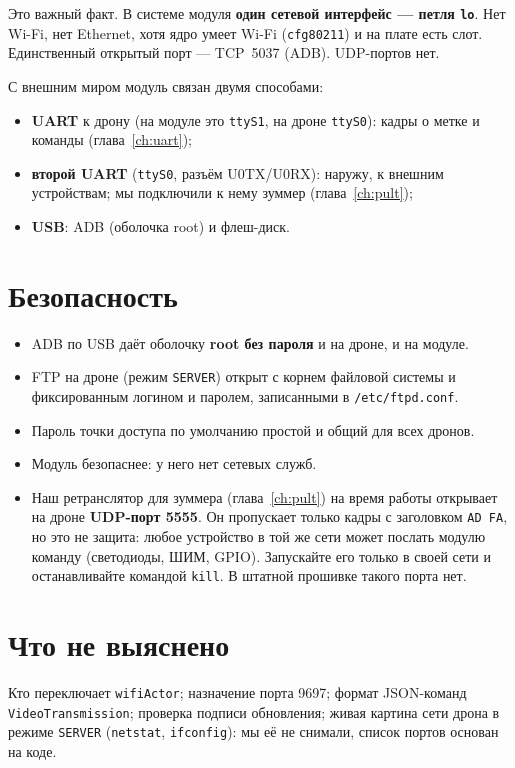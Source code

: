 Это важный факт. В системе модуля \textbf{один сетевой интерфейс --- петля \texttt{lo}}. Нет Wi-Fi, нет Ethernet, хотя ядро умеет Wi-Fi (\texttt{cfg80211}) и на плате есть слот. Единственный открытый порт --- TCP~5037 (ADB). UDP-портов нет. \pr{}

С внешним миром модуль связан двумя способами:
\begin{itemize}
  \item \textbf{UART} к дрону (на модуле это \texttt{ttyS1}, на дроне \texttt{ttyS0}): кадры о метке и команды (глава~\ref{ch:uart});
  \item \textbf{второй UART} (\texttt{ttyS0}, разъём U0TX/U0RX): наружу, к внешним устройствам; мы подключили к нему зуммер (глава~\ref{ch:pult}); \pr{}
  \item \textbf{USB}: ADB (оболочка root) и флеш-диск.
\end{itemize}

\section{Безопасность}

\begin{opasno}
\begin{itemize}
  \item ADB по USB даёт оболочку \textbf{root без пароля} и на дроне, и на модуле.
  \item FTP на дроне (режим \texttt{SERVER}) открыт с корнем файловой системы и фиксированным логином и паролем, записанными в \texttt{/etc/ftpd.conf}.
  \item Пароль точки доступа по умолчанию простой и общий для всех дронов.
  \item Модуль безопаснее: у него нет сетевых служб.
  \item Наш ретранслятор для зуммера (глава~\ref{ch:pult}) на время работы открывает на дроне \textbf{UDP-порт 5555}. Он пропускает только кадры с заголовком \texttt{AD FA}, но это не защита: любое устройство в той же сети может послать модулю команду (светодиоды, ШИМ, GPIO). Запускайте его только в своей сети и останавливайте командой \texttt{kill}. В штатной прошивке такого порта нет.
\end{itemize}
\end{opasno}

\section{Что не выяснено}

Кто переключает \texttt{wifiActor}; назначение порта 9697; формат JSON-команд \texttt{VideoTransmission}; проверка подписи обновления; живая картина сети дрона в режиме \texttt{SERVER} (\texttt{netstat}, \texttt{ifconfig}): мы её не снимали, список портов основан на коде. \nei{}

